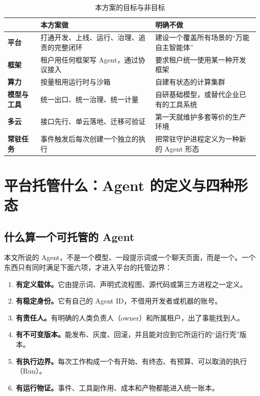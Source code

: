 \begin{table}[htbp]
\centering
\caption{本方案的目标与非目标}
\label{tab:goals}
\begin{tabularx}{\textwidth}{@{}>{\bfseries}L{2.2cm}YY@{}}
  \toprule
  & \textbf{本方案做} & \textbf{明确不做}\\
  \midrule
  平台 & 打通开发、上线、运行、治理、追责的完整闭环 & 建设一个覆盖所有场景的“万能自主智能体”\\
  框架 & 租户用任何框架写 Agent，通过协议接入 & 要求租户统一使用某一种开发框架\\
  算力 & 按量租用运行时与沙箱 & 自建有状态的计算集群\\
  模型与工具 & 统一出口、统一治理、统一计量 & 自研基础模型，或替代企业已有的工具系统\\
  多云 & 接口先行、单云落地、迁移可验证 & 第一天就维护多套等价的生产环境\\
  常驻任务 & 事件触发后每次创建一个独立的执行 & 把常驻守护进程定义为一种新的 Agent 形态\\
  \bottomrule
\end{tabularx}
\end{table}

\section{平台托管什么：Agent 的定义与四种形态}
\label{sec:agent-def}

\subsection{什么算一个可托管的 Agent}

本文所说的 Agent，不是一个模型、一段提示词或一个聊天页面，而是一个。一个东西只有同时满足下面六项，才进入平台的托管边界：

\begin{enumerate}
  \item \textbf{有定义载体。}它由提示词、声明式流程图、源代码或第三方进程之一定义。
  \item \textbf{有稳定身份。}它有自己的 Agent ID，不借用开发者或机器的账号。
  \item \textbf{有责任人。}有明确的人类负责人（owner）和所属租户，出了事能找到人。
  \item \textbf{有不可变版本。}能发布、灰度、回滚，并且能对应到它所运行的“运行壳”版本。
  \item \textbf{有执行边界。}每次工作构成一个有开始、有终态、有预算、可以取消的执行（Run）。
  \item \textbf{有运行物证。}事件、工具副作用、成本和产物都能进入统一账本。
\end{enumerate}

